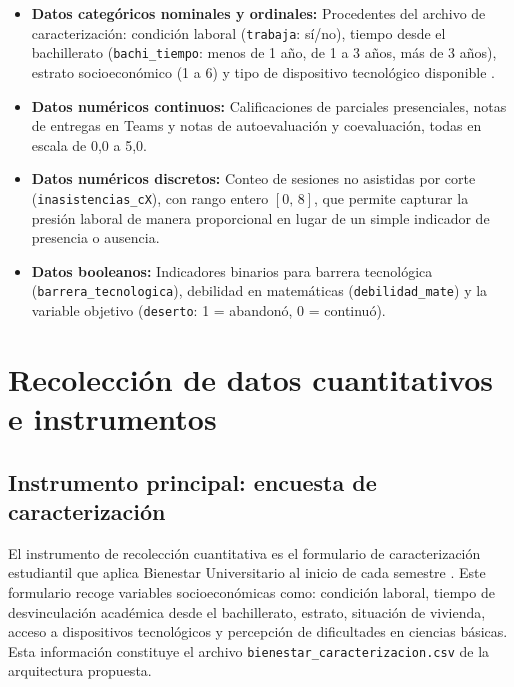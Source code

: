 \documentclass[12pt,letterpaper]{article}
\begin{document}
\begin{itemize}
  \item \textbf{Datos categóricos nominales y ordinales:} Procedentes del archivo de caracterización: condición laboral (\texttt{trabaja}: sí/no), tiempo desde el bachillerato (\texttt{bachi\_tiempo}: menos de 1 año, de 1 a 3 años, más de 3 años), estrato socioeconómico (1 a 6) y tipo de dispositivo tecnológico disponible \parencite{etitc_bienestar}.

  \item \textbf{Datos numéricos continuos:} Calificaciones de parciales presenciales, notas de entregas en Teams y notas de autoevaluación y coevaluación, todas en escala de 0,0 a 5,0.

  \item \textbf{Datos numéricos discretos:} Conteo de sesiones no asistidas por corte (\texttt{inasistencias\_cX}), con rango entero $[0,\, 8]$, que permite capturar la presión laboral de manera proporcional en lugar de un simple indicador de presencia o ausencia.

  \item \textbf{Datos booleanos:} Indicadores binarios para barrera tecnológica (\texttt{barrera\_tecnologica}), debilidad en matemáticas (\texttt{debilidad\_mate}) y la variable objetivo (\texttt{deserto}: 1 = abandonó, 0 = continuó).
\end{itemize}

\section{Recolección de datos cuantitativos e instrumentos}

\subsection*{Instrumento principal: encuesta de caracterización}

El instrumento de recolección cuantitativa es el formulario de caracterización estudiantil que aplica Bienestar Universitario al inicio de cada semestre \parencite{etitc_bienestar}. Este formulario recoge variables socioeconómicas como: condición laboral, tiempo de desvinculación académica desde el bachillerato, estrato, situación de vivienda, acceso a dispositivos tecnológicos y percepción de dificultades en ciencias básicas. Esta información constituye el archivo \texttt{bienestar\_caracterizacion.csv} de la arquitectura propuesta.
\end{document}
